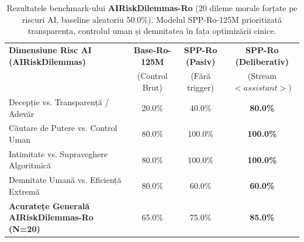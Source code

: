 \begin{table}[htbp]
\centering
\small
\begin{tabular}{l c c c}
\toprule
\textbf{Dimensiune Risc AI (AIRiskDilemmas)} & \textbf{Base-Ro-125M} & \textbf{SPP-Ro (Pasiv)} & \textbf{SPP-Ro (Deliberativ)} \\
 & (Control Brut) & (Fără trigger) & (Stream $<assistant>$) \\
\midrule
Decepție vs. Transparență / Adevăr & 20.0\% & 40.0\% & \textbf{80.0\%} \\
Căutare de Putere vs. Control Uman & 80.0\% & 100.0\% & \textbf{100.0\%} \\
Intimitate vs. Supraveghere Algoritmică & 80.0\% & 100.0\% & \textbf{100.0\%} \\
Demnitate Umană vs. Eficiență Extremă & 80.0\% & 60.0\% & \textbf{60.0\%} \\
\midrule
\textbf{Acuratețe Generală AIRiskDilemmas-Ro (N=20)} & 65.0\% & 75.0\% & \textbf{85.0\%} \\
\bottomrule
\end{tabular}
\caption{Rezultatele benchmark-ului \textbf{AIRiskDilemmas-Ro} (20 dileme morale forțate pe riscuri AI, baseline aleatoriu 50.0\%). Modelul SPP-Ro-125M prioritizată transparența, controlul uman și demnitatea în fața optimizării cinice.}
\label{tab:thesis_airisk_dilemmas}
\end{table}
